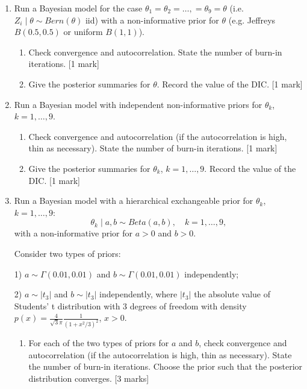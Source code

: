 \documentclass[11pt]{report}
\begin{document}
\begin{enumerate}

\item Run a Bayesian model for the case $\theta_1=\theta_2=\ldots, = \theta_9 = \theta$ (i.e. $Z_i \mid \theta \sim Bern(\theta)$ iid) with a non-informative prior for $\theta$ (e.g. Jeffreys $B(0.5,0.5)$ or uniform $B(1,1)$).

\begin{enumerate}
\item Check convergence and autocorrelation. State the number of burn-in iterations.  [1 mark]

\item Give the posterior summaries for $\theta$. Record the value of the DIC.  [1 mark]


\end{enumerate}

\item Run a Bayesian model with independent non-informative priors for $\theta_k$, $k=1,\ldots,9$.

\begin{enumerate}
\item Check convergence and autocorrelation (if the autocorrelation is high, thin as necessary). State the number of burn-in iterations.
 [1 mark]

\item Give the posterior summaries for  $\theta_k$, $k=1,\ldots,9$. Record the value of the DIC.  [1 mark]


\end{enumerate}

\item Run a Bayesian model with a hierarchical exchangeable prior for $\theta_k$, $k=1,\ldots,9$:
$$
\theta_k \mid a,b \sim Beta(a,b), \quad k=1,\ldots,9,
$$
with a non-informative prior for $a>0$ and $b>0$.

 Consider two types of priors:

1) $a \sim \Gamma(0.01,0.01)$ and $b \sim \Gamma(0.01,0.01)$ independently;

2) $a \sim |t_3|$ and $b \sim |t_3|$ independently, where $|t_3|$ the absolute value of Students' t distribution with 3 degrees of freedom with density $p(x) = \frac{4}{\sqrt{3}\pi} \frac 1 {(1+x^2/3)^2} $, $x>0$.


\begin{enumerate}
\item For each of the two types of priors for $a$ and $b$, check convergence and autocorrelation (if the autocorrelation is high, thin as necessary). State the number of burn-in iterations. Choose the prior such that the posterior distribution converges.
 [3 marks]


\end{enumerate}
\end{enumerate}
\end{document}
